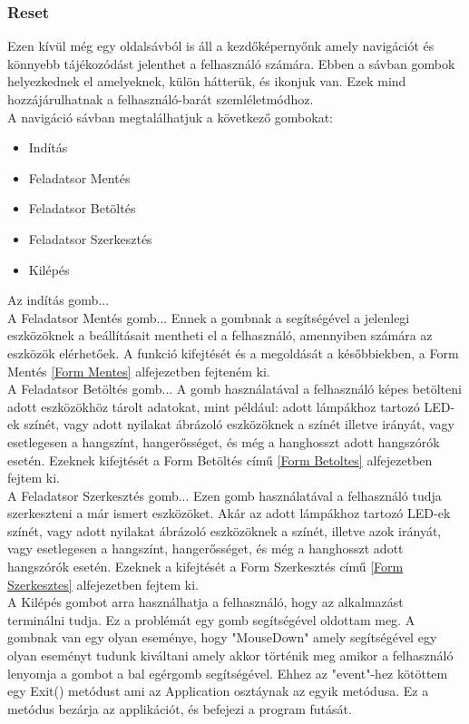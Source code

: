 \documentclass[tocnopagenum]{thesis-ekf}
\theoremstyle{definition}
\theoremstyle{remark}
\begin{document}
	\subsubsection{Reset}
	Ezen kívül még egy oldalsávból is áll a kezdőképernyőnk amely navigációt és könnyebb tájékozódást jelenthet a felhasználó számára.
	Ebben a sávban gombok helyezkednek el amelyeknek, külön hátterük, és ikonjuk van. Ezek mind hozzájárulhatnak a felhasználó-barát szemléletmódhoz.
	\\
	A navigáció sávban megtalálhatjuk a következő gombokat:
	\begin{itemize}
		\item Indítás
		\item Feladatsor Mentés
		\item Feladatsor Betöltés
		\item Feladatsor Szerkesztés
		\item Kilépés
	\end{itemize}
	Az indítás gomb...
	\\
	A Feladatsor Mentés gomb...
	Ennek a gombnak a segítségével a jelenlegi eszközöknek a beállításait mentheti el a felhasználó, amennyiben számára az eszközök elérhetőek. A funkció kifejtését és a megoldását a későbbiekben, a Form Mentés \ref{Form Mentes} alfejezetben fejteném ki.
	\\
	A Feladatsor Betöltés gomb...
	A gomb használatával a felhasználó képes betölteni adott eszközökhöz tárolt adatokat, mint például: adott lámpákhoz tartozó LED-ek színét, vagy adott nyilakat ábrázoló eszközöknek a színét illetve irányát, vagy esetlegesen a hangszínt, hangerősséget, és még a hanghosszt adott hangszórók esetén.
	Ezeknek kifejtését a Form Betöltés című \ref{Form Betoltes}
	alfejezetben fejtem ki.
	\\
	A Feladatsor Szerkesztés gomb...
	Ezen gomb használatával a felhasználó tudja szerkeszteni a már ismert eszközöket. Akár az adott lámpákhoz tartozó LED-ek színét, vagy adott nyilakat ábrázoló eszközöknek a színét, illetve azok irányát, vagy esetlegesen a hangszínt, hangerősséget, és még a hanghosszt adott hangszórók esetén.
	Ezeknek a kifejtését a Form Szerkesztés című \ref{Form Szerkesztes}	alfejezetben fejtem ki.
	\\
	A Kilépés gombot arra használhatja a felhasználó, hogy az alkalmazást terminálni tudja. Ez a problémát egy gomb segítségével oldottam meg. A gombnak van egy olyan eseménye, hogy "MouseDown" amely segítségével egy olyan eseményt tudunk kiváltani amely akkor történik meg amikor a felhasználó lenyomja a gombot a bal egérgomb segítségével.
	Ehhez az "event"-hez kötöttem egy Exit() metódust ami az Application osztáynak az egyik metódusa. Ez a metódus bezárja az applikációt, és befejezi a program futását. 
\end{document}
